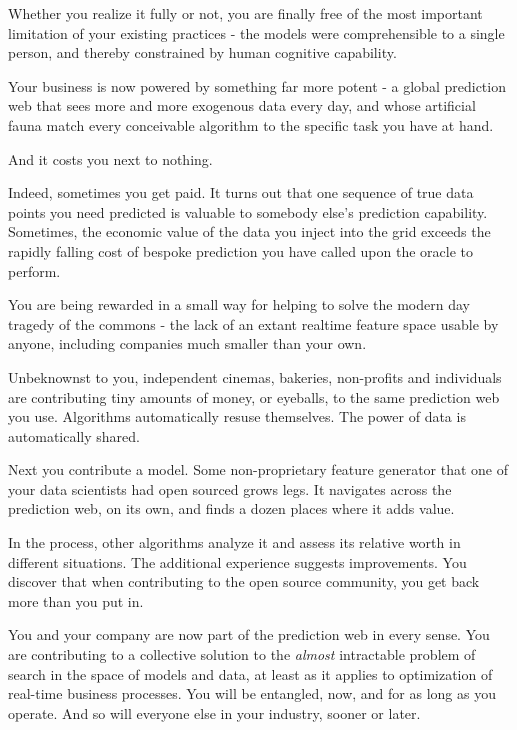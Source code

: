 Whether you realize it fully or not, you are finally free of the most important limitation of your existing practices - the models were comprehensible to a single person, and thereby constrained by human cognitive capability. 

Your business is now powered by something far more potent - a global prediction web that sees more and more exogenous data every day, and whose artificial fauna match every conceivable algorithm to the specific task you have at hand.  

And it costs you next to nothing. 

Indeed, sometimes you get paid. It turns out that one sequence of true data points you need predicted is valuable to somebody else's prediction capability. Sometimes, the economic value of the data you inject into the grid exceeds the rapidly falling cost of bespoke prediction you have called upon the oracle to perform. 

You are being rewarded in a small way for helping to solve the modern day tragedy of the commons - the lack of an extant realtime feature space usable by anyone, including companies much smaller than your own. 

Unbeknownst to you, independent cinemas, bakeries, non-profits and individuals are contributing tiny amounts of money, or eyeballs, to the same prediction web you use. Algorithms automatically resuse themselves. The power of data is automatically shared. 

Next you contribute a model. Some non-proprietary feature generator that one of your data scientists had open sourced grows legs. It navigates across the prediction web, on its own, and finds a dozen places where it adds value. 

In the process, other algorithms analyze it and assess its relative worth in different situations. The additional experience suggests improvements. You discover that when contributing to the open source community, you get back more than you put in. 


You and your company are now part of the prediction web in every sense. You are contributing to a collective solution to the {\em almost} intractable problem of search in the space of models and data, at least as it applies to 
optimization of real-time business processes. You will be entangled, now, and for as long as you operate. And so will everyone else in your industry, sooner or later. 